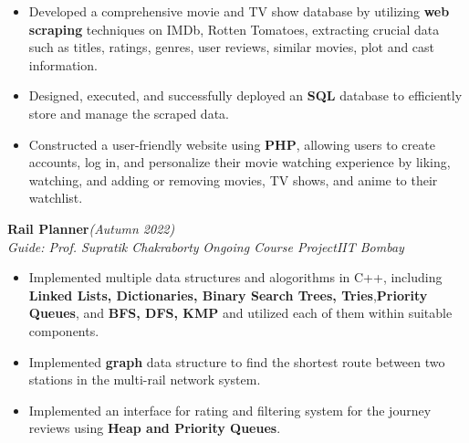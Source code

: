 \documentclass[10 pt]{article}
\begin{document}
		\begin{itemize}[itemsep = -0.8 mm, leftmargin=*]
		\vspace{-16pt}
		\item Developed a comprehensive movie and TV show database by utilizing \textbf{web scraping} techniques on IMDb, Rotten Tomatoes, extracting crucial data such as titles, ratings, genres, user reviews, similar movies, plot and cast information.
		\item Designed, executed, and successfully deployed an \textbf{SQL} database to efficiently store and manage the scraped data.
		\item Constructed a user-friendly website using \textbf{PHP}, allowing users to create accounts, log in, and personalize their movie watching experience by liking, watching, and adding or removing movies, TV shows, and anime to their watchlist.
	\end{itemize}
{\selectfont
		\textbf{{Rail Planner}}\hfill{\sl \small (Autumn 2022)}\\
	}{\it Guide: Prof. Supratik Chakraborty \textbar} {\it Ongoing Course Project}\hfill{\sl \small IIT Bombay}\\
	\begin{itemize}[itemsep = -0.8 mm, leftmargin=*]
		\vspace{-16pt}
		\item Implemented multiple data structures and alogorithms in C++, including \textbf{Linked Lists, Dictionaries, Binary Search Trees, Tries},\textbf{Priority Queues}, and \textbf{BFS, DFS, KMP} and utilized each of them within suitable components.
\item Implemented {\bf graph} data structure to find the shortest route between two stations in the multi-rail network system.
\item Implemented an interface for rating and filtering system for the journey reviews using \textbf{Heap and Priority Queues}.
	\end{itemize}
\vspace{\baselineskip}
\vspace{-16pt}
\end{document}
